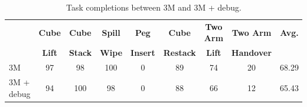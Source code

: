 \begin{table}[h]
\centering
\small
\begin{tabular}{l*{8}{c}}
\hline
\textbf{} & \textbf{Cube} & \textbf{Cube} & \textbf{Spill} & \textbf{Peg} & \textbf{Cube} & \textbf{Two Arm} & \textbf{Two Arm} & \textbf{Avg.} \\
 & \textbf{Lift} & \textbf{Stack} & \textbf{Wipe} & \textbf{Insert} & \textbf{Restack} & \textbf{Lift} & \textbf{Handover} & \\
\hline
3M & 97 & 98 & 100 & 0 & 89 & 74 & 20 & 68.29 \\
3M + debug & 94 & 100 & 98 & 0 & 88 & 66 & 12 & 65.43 \\
\hline
\end{tabular}
\caption{Task completions between 3M and 3M + debug.}
\label{tab:performance}
\end{table}

